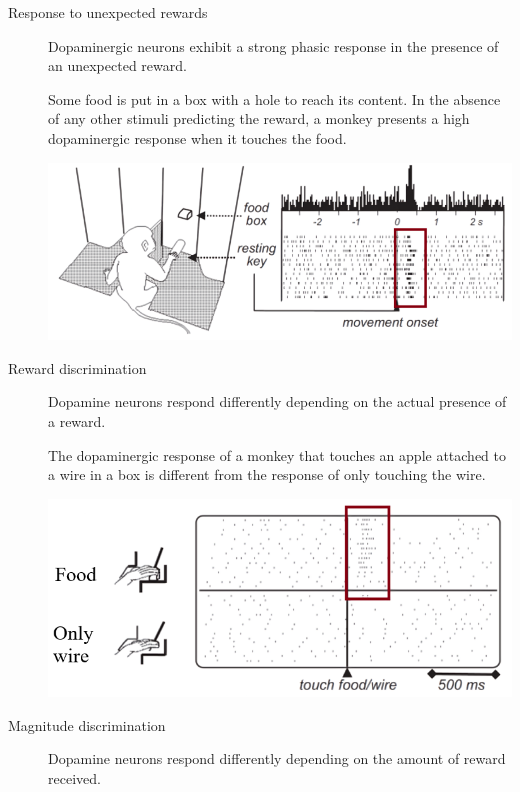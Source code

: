\begin{description}
    \item[Response to unexpected rewards] 
        Dopaminergic neurons exhibit a strong phasic response in the presence of an unexpected reward.

        \begin{casestudy}
            Some food is put in a box with a hole to reach its content.
            In the absence of any other stimuli predicting the reward, 
            a monkey presents a high dopaminergic response when it touches the food.
            \begin{center}
                \includegraphics[width=0.55\linewidth]{./img/dopamine_monkey1.png}    
            \end{center}
        \end{casestudy}

    \item[Reward discrimination] 
        Dopamine neurons respond differently depending on the actual presence of a reward.

        \begin{casestudy}
            The dopaminergic response of a monkey that touches an apple attached to a wire in a box is different 
            from the response of only touching the wire.
            \begin{center}
                \includegraphics[width=0.5\linewidth]{./img/dopamine_monkey2.png}    
            \end{center}
        \end{casestudy}

    \item[Magnitude discrimination] 
        Dopamine neurons respond differently depending on the amount of reward received.


\end{description}
